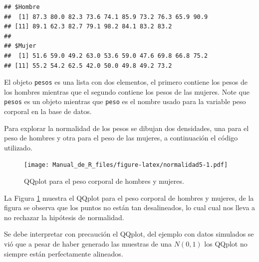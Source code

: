 \documentclass[10pt,]{krantz}
\makeatletter
\newenvironment{Shaded}{\begin{snugshade}}{\end{snugshade}}
\newcommand{\KeywordTok}[1]{\textcolor[rgb]{0.13,0.29,0.53}{\textbf{#1}}}
\newcommand{\DataTypeTok}[1]{\textcolor[rgb]{0.13,0.29,0.53}{#1}}
\newcommand{\DecValTok}[1]{\textcolor[rgb]{0.00,0.00,0.81}{#1}}
\newcommand{\StringTok}[1]{\textcolor[rgb]{0.31,0.60,0.02}{#1}}
\newcommand{\OperatorTok}[1]{\textcolor[rgb]{0.81,0.36,0.00}{\textbf{#1}}}
\newcommand{\NormalTok}[1]{#1}
\newenvironment{kframe}{%
\medskip{}
\setlength{\fboxsep}{.8em}
 \def\at@end@of@kframe{}%
 \ifinner\ifhmode%
  \def\at@end@of@kframe{\end{minipage}}%
  \begin{minipage}{\columnwidth}%
 \fi\fi%
 \def\FrameCommand##1{\hskip\@totalleftmargin \hskip-\fboxsep
 \colorbox{shadecolor}{##1}\hskip-\fboxsep
     \hskip-\linewidth \hskip-\@totalleftmargin \hskip\columnwidth}%
 \MakeFramed {\advance\hsize-\width
   \@totalleftmargin\z@ \linewidth\hsize
   \@setminipage}}%
 {\par\unskip\endMakeFramed%
 \at@end@of@kframe}
\renewenvironment{Shaded}{\begin{kframe}}{\end{kframe}}
\let\BeginKnitrBlock\begin \let\EndKnitrBlock\end
\makeatother
\begin{document}
\begin{verbatim}
## $Hombre
##  [1] 87.3 80.0 82.3 73.6 74.1 85.9 73.2 76.3 65.9 90.9
## [11] 89.1 62.3 82.7 79.1 98.2 84.1 83.2 83.2
## 
## $Mujer
##  [1] 51.6 59.0 49.2 63.0 53.6 59.0 47.6 69.8 66.8 75.2
## [11] 55.2 54.2 62.5 42.0 50.0 49.8 49.2 73.2
\end{verbatim}

El objeto \texttt{pesos} es una lista con dos elementos, el primero
contiene los pesos de los hombres mientras que el segundo contiene los
pesos de las mujeres. Note que \texttt{pesos} es un objeto mientras que
\texttt{peso} es el nombre usado para la variable peso corporal en la
base de datos.

Para explorar la normalidad de los pesos se dibujan dos densidades, una
para el peso de hombres y otra para el peso de las mujeres, a
continuación el código utilizado.

\begin{Shaded}
\end{Shaded}

\begin{figure}
\centering
\texttt{[image: Manual\_de\_R\_files/figure-latex/normalidad5-1.pdf]}
\caption{\label{fig:normalidad5}QQplot para el peso corporal de hombres y
mujeres.}
\end{figure}

La Figura \ref{fig:normalidad5} muestra el QQplot para el peso corporal
de hombres y mujeres, de la figura se observa que los puntos no están
tan desalineados, lo cual cual nos lleva a no rechazar la hipótesis de
normalidad.

\BeginKnitrBlock{rmdwarning}
Se debe interpretar con precaución el QQplot, del ejemplo con datos
simulados se vió que a pesar de haber generado las muestras de una
\(N(0,1)\) los QQplot no siempre están perfectamente alineados.
\EndKnitrBlock{rmdwarning}
\end{document}
